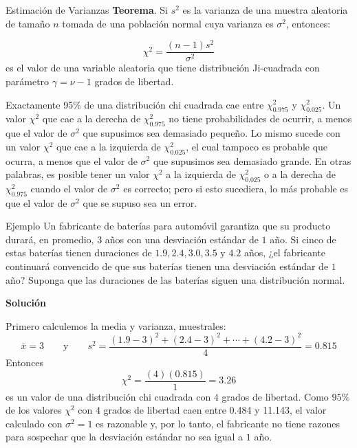 \documentclass[
  10pt,
  ignorenonframetext,
]{beamer}
\begin{document}
\begin{frame}{}
\protect\hypertarget{section-50}{}
\begin{block}{Estimación de Varianzas}
\protect\hypertarget{estimaciuxf3n-de-varianzas}{}
\textbf{Teorema}. Si \(s^2\) es la varianza de una muestra aleatoria de
tamaño \(n\) tomada de una población normal cuya varianza es
\(\sigma^2\), entonces:

\[\chi^2=\frac{(n-1)s^2}{\sigma^2}\] es el valor de una variable
aleatoria que tiene distribución Ji-cuadrada con parámetro
\(\gamma = \nu - 1\) grados de libertad.

\bigskip

Exactamente 95\% de una distribución chi cuadrada cae entre
\(\chi_{0.975}^2\) y \(\chi_{0.025}^2\). Un valor \(\chi^2\) que cae a
la derecha de \(\chi_{0.975}^2\) no tiene probabilidades de ocurrir, a
menos que el valor de \(\sigma^2\) que supusimos sea demasiado pequeño.
Lo mismo sucede con un valor \(\chi^2\) que cae a la izquierda de
\(\chi_{0.025}^2\), el cual tampoco es probable que ocurra, a menos que
el valor de \(\sigma^2\) que supusimos sea demasiado grande. En otras
palabras, es posible tener un valor \(\chi^2\) a la izquierda de
\(\chi_{0.025}^2\) o a la derecha de \(\chi_{0.975}^2\) cuando el valor
de \(\sigma^2\) es correcto; pero si esto sucediera, lo más probable es
que el valor de \(\sigma^2\) que se supuso sea un error.
\end{block}
\end{frame}

\begin{frame}{}
\protect\hypertarget{section-51}{}
\begin{block}{Ejemplo}
\protect\hypertarget{ejemplo-2}{}
Un fabricante de baterías para automóvil garantiza que su producto
durará, en promedio, \(3\) años con una desviación estándar de \(1\)
año. Si cinco de estas baterías tienen duraciones de
\(1.9, 2.4, 3.0, 3.5\mbox{ y }4.2\) años, ¿el fabricante continuará
convencido de que sus baterías tienen una desviación estándar de \(1\)
año? Suponga que las duraciones de las baterías siguen una distribución
normal.

\textbf{Solución}

Primero calculemos la media y varianza, muestrales:
\[\bar{x}=3 \qquad \mbox{y} \qquad s^2 = \frac{(1.9-3)^2 + (2.4-3)^2 + \cdots + (4.2-3)^2}{4}=0.815\]
Entonces \[\chi^2=\frac{(4)(0.815)}{1}=3.26\] es un valor de una
distribución chi cuadrada con \(4\) grados de libertad. Como \(95\%\) de
los valores \(\chi^2\) con \(4\) grados de libertad caen entre 0.484 y
11.143, el valor calculado con \(\sigma^2 = 1\) es razonable y, por lo
tanto, el fabricante no tiene razones para sospechar que la desviación
estándar no sea igual a \(1\) año.
\end{block}
\end{frame}
\end{document}
